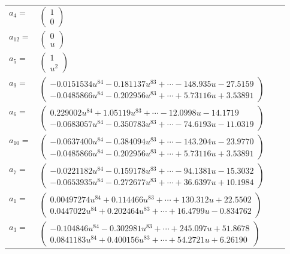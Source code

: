 \documentclass[1p]{elsarticle_modified}
\theoremstyle{definition}
\begin{document}
\begin{tabular}{m{7pt} m{180pt} m{7pt} m{180pt} }
\flushright $a_{4}=$&$\begin{pmatrix}1\\0\end{pmatrix}$ \\
\flushright $a_{12}=$&$\begin{pmatrix}0\\u\end{pmatrix}$ \\
\flushright $a_{5}=$&$\begin{pmatrix}1\\u^2\end{pmatrix}$ \\
\flushright $a_{9}=$&$\begin{pmatrix}-0.0151534 u^{84}-0.181137 u^{83}+\cdots-148.935 u-27.5159\\-0.0485866 u^{84}-0.202956 u^{83}+\cdots+5.73116 u+3.53891\end{pmatrix}$ \\
\flushright $a_{6}=$&$\begin{pmatrix}0.229002 u^{84}+1.05119 u^{83}+\cdots-12.0998 u-14.1719\\-0.0683057 u^{84}-0.350783 u^{83}+\cdots-74.6193 u-11.0319\end{pmatrix}$ \\
\flushright $a_{10}=$&$\begin{pmatrix}-0.0637400 u^{84}-0.384094 u^{83}+\cdots-143.204 u-23.9770\\-0.0485866 u^{84}-0.202956 u^{83}+\cdots+5.73116 u+3.53891\end{pmatrix}$ \\
\flushright $a_{7}=$&$\begin{pmatrix}-0.0221182 u^{84}-0.159178 u^{83}+\cdots-94.1381 u-15.3032\\-0.0653935 u^{84}-0.272677 u^{83}+\cdots+36.6397 u+10.1984\end{pmatrix}$ \\
\flushright $a_{1}=$&$\begin{pmatrix}0.00497274 u^{84}+0.114466 u^{83}+\cdots+130.312 u+22.5502\\0.0447022 u^{84}+0.202464 u^{83}+\cdots+16.4799 u-0.834762\end{pmatrix}$ \\
\flushright $a_{3}=$&$\begin{pmatrix}-0.104846 u^{84}-0.302981 u^{83}+\cdots+245.097 u+51.8678\\0.0841183 u^{84}+0.400156 u^{83}+\cdots+54.2721 u+6.26190\end{pmatrix}$ \\

\end{tabular}
\end{document}
